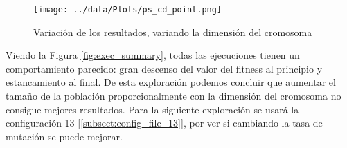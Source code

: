 \begin{figure}[]
	\centering	
	\texttt{[image: ../data/Plots/ps\_cd\_point.png]}
	\caption{ Variación de los resultados, variando la dimensión del cromosoma }
    \label{fig:box_plots_crom_dim}
\end{figure}

Viendo la Figura \ref{fig:exec_summary}, todas las ejecuciones tienen un comportamiento parecido: gran descenso del valor del fitness al principio y estancamiento al final.
De esta exploración podemos concluir que aumentar el tamaño de la población proporcionalmente con la dimensión del cromosoma no consigue mejores resultados. Para la 
siguiente exploración se usará la configuración 13 [\ref{subsect:config_file_13}], por ver si cambiando la tasa de mutación se puede mejorar.